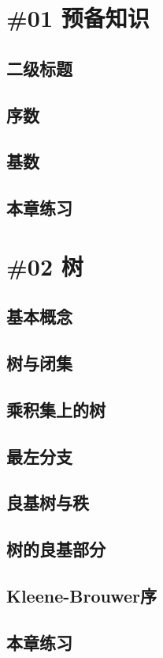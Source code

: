 \section{\#01 预备知识}
\subsection{二级标题}

\newpage
\subsection{序数}
\newpage
\subsection{基数}
\newpage
\subsection{本章练习}
\newpage

\section{\#02 树}
\subsection{基本概念}
\newpage
\subsection{树与闭集}
\newpage
\subsection{乘积集上的树}
\newpage
\subsection{最左分支}
\newpage
\subsection{良基树与秩}
\newpage
\subsection{树的良基部分}
\newpage
\subsection{Kleene-Brouwer序}
\newpage
\subsection{本章练习}
\newpage

